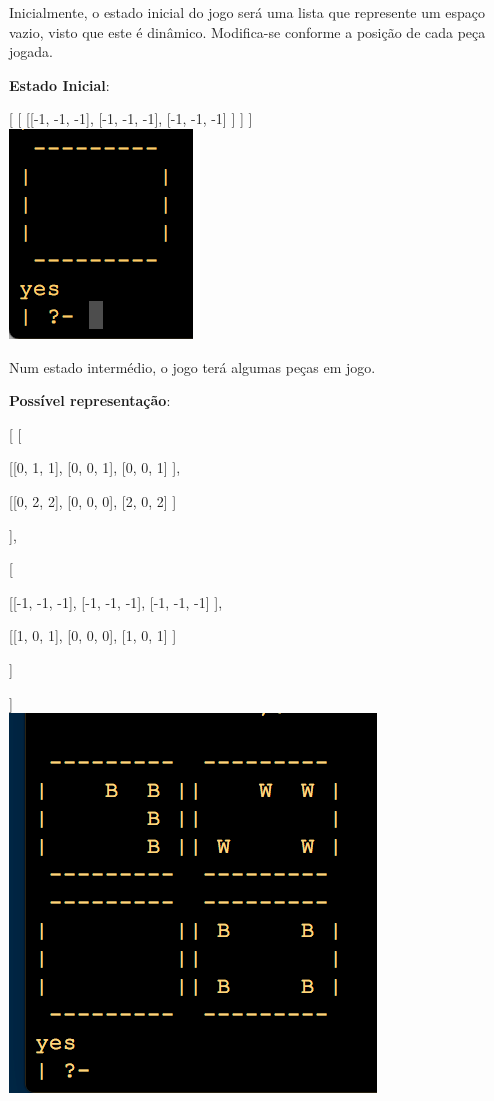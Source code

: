 \documentclass[a4paper]{article}
\begin{document}
Inicialmente, o estado inicial do jogo será uma lista que represente um espaço vazio, visto que este é dinâmico. Modifica-se conforme a posição de cada peça jogada.

\textbf{Estado Inicial}:

[
  [
      [[-1, -1, -1],
		  [-1, -1, -1],
		  [-1, -1, -1]
		 ]
                      ]
	                 ]\linebreak\linebreak\\

\includegraphics[scale=0.8]{../printscreens/initial_board.png} \linebreak


Num estado intermédio, o jogo terá algumas peças em jogo.

\textbf{Possível representação}:

	[
		[

		 [[0, 1, 1],
		  [0, 0, 1],
		  [0, 0, 1]
		 ],

		 [[0, 2, 2],
		  [0, 0, 0],
		  [2, 0, 2]
		 ]

		],


		[

		 [[-1, -1, -1],
		  [-1, -1, -1],
		  [-1, -1, -1]
		 ],

		 [[1, 0, 1],
		  [0, 0, 0],
		  [1, 0, 1]
		 ]

		]

	]\linebreak\linebreak\\

\includegraphics[scale=0.8]{../printscreens/intermediate_board.png} \linebreak
\end{document}
